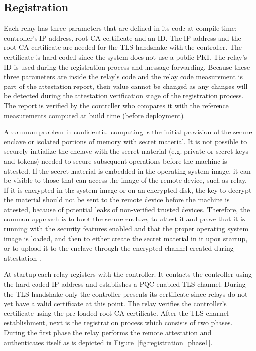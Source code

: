 \documentclass[futureinternet,article,submit,moreauthors]{Definitions/mdpi}
\begin{document}
\subsection{Registration}

Each relay has three parameters that are defined in its code at compile time: controller's IP address, root CA certificate and an ID. The IP address and the root CA certificate are needed for the TLS handshake with the controller. The certificate is hard coded since the system does not use a public PKI. The relay's ID is used during the registration process and message forwarding. Because these three parameters are inside the relay's code and the relay code measurement is part of the attestation report, their value cannot be changed as any changes will be detected during the attestation verification stage of the registration process. The report is verified by the controller who compares it with the reference measurements computed at build time (before deployment).

A common problem in confidential computing is the initial provision of the secure enclave or isolated portions of memory with secret material. It is not possible to securely initialize the enclave with the secret material (e.g. private or secret keys and tokens) needed to secure subsequent operations before the machine is attested. If the secret material is embedded in the operating system image, it can be visible to those that can access the image of the remote device, such as relay. If it is encrypted in the system image or on an encrypted disk, the key to decrypt the material should not be sent to the remote device before the machine is attested, because of potential leaks of non-verified trusted devices. Therefore, the common approach is to boot the secure enclave, to attest it and prove that it is running with the security features enabled and that the proper operating system image is loaded, and then to either create the secret material in it upon startup, or to upload it to the enclave through the encrypted channel created during attestation~\cite{novak_trustworthy_2026}.

At startup each relay registers with the controller. It contacts the controller using the hard coded IP address and establishes a PQC-enabled TLS channel. During the TLS handshake only the controller presents its certificate since relays do not yet have a valid certificate at this point.  The relay verifies the controller's certificate using the pre-loaded root CA certificate. After the TLS channel establishment, next is the registration process which consists of two phases. During the first phase the relay performs the remote attestation and authenticates itself as is depicted in Figure~\ref{fig:registration_phase1}.
\end{document}
